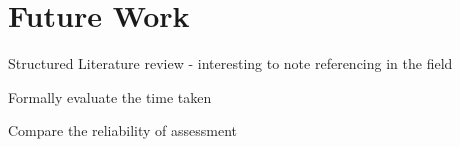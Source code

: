 




\section{Future Work} %
\label{sec:future_work}

Structured Literature review - interesting to note referencing in the field

Formally evaluate the time taken

Compare the reliability of assessment



